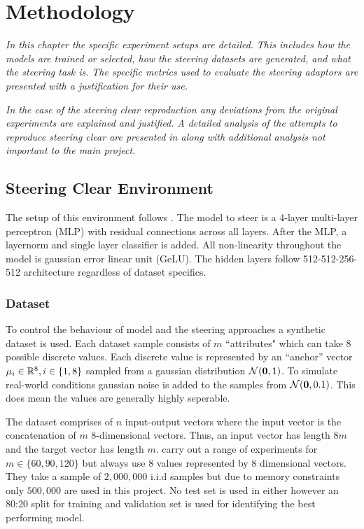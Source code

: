 \chapter{Methodology}
\label{ch:methodology}

\emph{In this chapter the specific experiment setups are detailed.}
\emph{This includes how the models are trained or selected, how the steering datasets are generated, and what the steering task is.}
\emph{The specific metrics used to evaluate the steering adaptors are presented with a justification for their use.}

\emph{In the case of the steering clear \citep{steering-clear} reproduction any deviations from the original experiments are explained and justified.}
\emph{A detailed analysis of the attempts to reproduce steering clear are presented in  along with additional analysis not important to the main project.}

\section{Steering Clear Environment}
\label{sec:steering-clear}

The setup of this environment follows \citep{steering-clear}.
The model to steer is a 4-layer multi-layer perceptron (MLP) with residual connections \citep{resnet} across all layers.
After the MLP, a layernorm \citep{layernorm} and single layer classifier is added.
All non-linearity throughout the model is gaussian error linear unit (GeLU).
The hidden layers follow 512-512-256-512 architecture regardless of dataset specifics.

\subsection{Dataset}
\label{steering-clear:dataset}

To control the behaviour of model and the steering approaches a synthetic dataset is used.
Each dataset sample consists of $m$ ``attributes" which can take 8 possible discrete values.
Each discrete value is represented by an ``anchor'' vector $\mathbf{\mu}_i \in \mathbb{R}^8, i \in \{1,8\}$ sampled from a gaussian distribution $\mathcal{N}(\mathbf{0}, 1)$.
To simulate real-world conditions gaussian noise is added to the samples from $\mathcal{N}(\mathbf{0}, 0.1)$.
This does mean the values are generally highly seperable.

The dataset comprises of $n$ input-output vectors where the input vector is the concatenation of $m$ 8-dimensional vectors.
Thus, an input vector has length $8m$ and the target vector has length $m$.
\citet{steering-clear} carry out a range of experiments for $m \in \{60, 90, 120\}$ but always use 8 values represented by 8 dimensional vectors.
They take a sample of $2,000,000$ i.i.d samples but due to memory constraints only $500,000$ are used in this project.
No test set is used in either however an 80:20 split for training and validation set is used for identifying the best performing model.

